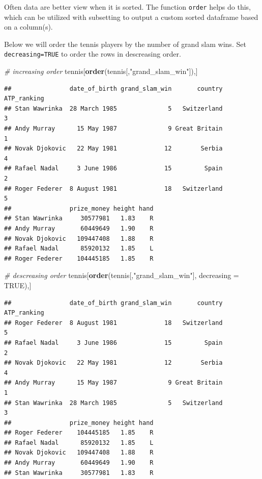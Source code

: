 \documentclass[12pt,]{krantz}
\newenvironment{Shaded}{\begin{snugshade}}{\end{snugshade}}
\newcommand{\KeywordTok}[1]{\textcolor[rgb]{0.27,0.27,0.27}{\textbf{#1}}}
\newcommand{\DataTypeTok}[1]{\textcolor[rgb]{0.27,0.27,0.27}{#1}}
\newcommand{\StringTok}[1]{\textcolor[rgb]{0.5,0.5,0.5}{#1}}
\newcommand{\CommentTok}[1]{\textcolor[rgb]{0.37,0.37,0.37}{\textit{#1}}}
\newcommand{\OtherTok}[1]{\textcolor[rgb]{0.37,0.37,0.37}{#1}}
\newcommand{\NormalTok}[1]{#1}
\begin{document}
Often data are better view when it is sorted. The function
\texttt{order} helps do this, which can be utilized with subsetting to
output a custom sorted dataframe based on a column(s).

Below we will order the tennis players by the number of grand slam wins.
Set \texttt{decreasing=TRUE} to order the rows in descreasing order.

\begin{Shaded}
\begin{Highlighting}[]
\CommentTok{# increasing order}
\NormalTok{tennis[}\KeywordTok{order}\NormalTok{(tennis[,}\StringTok{"grand_slam_win"}\NormalTok{]),]}
\end{Highlighting}
\end{Shaded}

\begin{verbatim}
##                date_of_birth grand_slam_win       country ATP_ranking
## Stan Wawrinka  28 March 1985              5   Switzerland           3
## Andy Murray      15 May 1987              9 Great Britain           1
## Novak Djokovic   22 May 1981             12        Serbia           4
## Rafael Nadal     3 June 1986             15         Spain           2
## Roger Federer  8 August 1981             18   Switzerland           5
##                prize_money height hand
## Stan Wawrinka     30577981   1.83    R
## Andy Murray       60449649   1.90    R
## Novak Djokovic   109447408   1.88    R
## Rafael Nadal      85920132   1.85    L
## Roger Federer    104445185   1.85    R
\end{verbatim}

\begin{Shaded}
\begin{Highlighting}[]
\CommentTok{# descreasing order}
\NormalTok{tennis[}\KeywordTok{order}\NormalTok{(tennis[,}\StringTok{"grand_slam_win"}\NormalTok{], }\DataTypeTok{decreasing =} \OtherTok{TRUE}\NormalTok{),]}
\end{Highlighting}
\end{Shaded}

\begin{verbatim}
##                date_of_birth grand_slam_win       country ATP_ranking
## Roger Federer  8 August 1981             18   Switzerland           5
## Rafael Nadal     3 June 1986             15         Spain           2
## Novak Djokovic   22 May 1981             12        Serbia           4
## Andy Murray      15 May 1987              9 Great Britain           1
## Stan Wawrinka  28 March 1985              5   Switzerland           3
##                prize_money height hand
## Roger Federer    104445185   1.85    R
## Rafael Nadal      85920132   1.85    L
## Novak Djokovic   109447408   1.88    R
## Andy Murray       60449649   1.90    R
## Stan Wawrinka     30577981   1.83    R
\end{verbatim}
\end{document}
